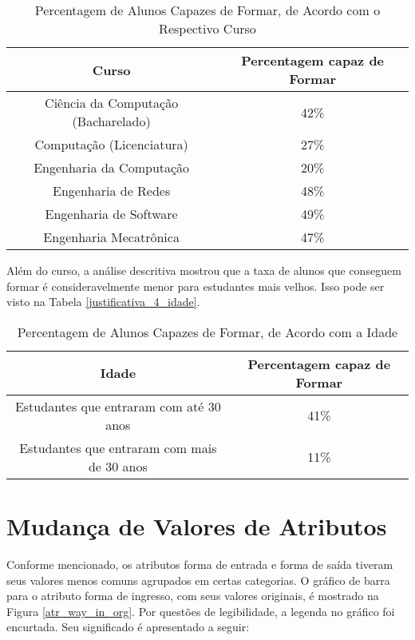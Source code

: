 \begin{table}
\begin{center}
\begin{tabular}[c]{| c | c |}
    \hline
    \textbf{Curso} & \textbf{Percentagem capaz de Formar} \\
    \hline
    Ciência da Computação (Bacharelado) & 42\% \\
    \hline
    Computação (Licenciatura) & 27\% \\
    \hline
    Engenharia da Computação & 20\% \\
    \hline
    Engenharia de Redes & 48\% \\
    \hline
    Engenharia de Software & 49\% \\
    \hline
    Engenharia Mecatrônica & 47\% \\
    \hline
\end{tabular}
\end{center}
\caption{Percentagem de Alunos Capazes de Formar, de Acordo com o Respectivo
    Curso}
\label{justificativa_4_curso}
\end{table}

\par Além do curso, a análise descritiva mostrou que a taxa de alunos que conseguem
formar é consideravelmente menor para estudantes mais velhos. Isso pode ser visto na
Tabela \ref{justificativa_4_idade}.

\begin{table}
\begin{center}
\begin{tabular}[c]{| c | c |}
    \hline
    \textbf{Idade} & \textbf{Percentagem capaz de Formar} \\
    \hline
    Estudantes que entraram com até 30 anos & 41\% \\
    \hline
    Estudantes que entraram com mais de 30 anos & 11\% \\
    \hline
\end{tabular}
\end{center}
\caption{Percentagem de Alunos Capazes de Formar, de Acordo com a Idade}
\label{justificativa_4_curso}
\end{table}

\section{Mudança de Valores de Atributos}
Conforme mencionado, os atributos forma de entrada e forma de saída tiveram seus
valores menos comuns agrupados em certas categorias. O gráfico de barra para o
atributo forma de ingresso, com seus valores originais, é mostrado na Figura
\ref{atr_way_in_org}. 
Por questões de legibilidade, a legenda no gráfico foi encurtada. Seu significado é
apresentado a seguir: 

